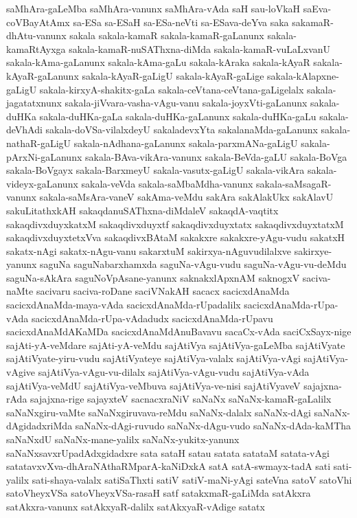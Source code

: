 {saMhAra-gaLeMba
saMhAra-vanunx
saMhAra-vAda
saH
sau-loVkaH
saEva-coVBayAtAmx
sa-ESa
sa-ESaH
sa-ESa-neVti
sa-ESava-deYva
saka
sakamaR-dhAtu-vanunx
sakala
sakala-kamaR
sakala-kamaR-gaLanunx
sakala-kamaRtAyxga
sakala-kamaR-nuSAThxna-diMda
sakala-kamaR-vuLaLxvanU
sakala-kAma-gaLanunx
sakala-kAma-gaLu
sakala-kAraka
sakala-kAyaR
sakala-kAyaR-gaLanunx
sakala-kAyaR-gaLigU
sakala-kAyaR-gaLige
sakala-kAlapxne-gaLigU
sakala-kirxyA-shakitx-gaLa
sakala-ceVtana-ceVtana-gaLigelalx
sakala-jagatatxnunx
sakala-jiVvara-vasha-vAgu-vanu
sakala-joyxVti-gaLanunx
sakala-duHKa
sakala-duHKa-gaLa
sakala-duHKa-gaLanunx
sakala-duHKa-gaLu
sakala-deVhAdi
sakala-doVSa-vilalxdeyU
sakaladevxYta
sakalanaMda-gaLanunx
sakala-nathaR-gaLigU
sakala-nAdhana-gaLanunx
sakala-parxmANa-gaLigU
sakala-pArxNi-gaLanunx
sakala-BAva-vikAra-vanunx
sakala-BeVda-gaLU
sakala-BoVga
sakala-BoVgayx
sakala-BarxmeyU
sakala-vasutx-gaLigU
sakala-vikAra
sakala-videyx-gaLanunx
sakala-veVda
sakala-saMbaMdha-vanunx
sakala-saMsagaR-vanunx
sakala-saMsAra-vaneV
sakAma-veMdu
sakAra
sakAlakUkx
sakAlavU
sakuLitathxkAH
sakaqdanuSAThxna-diMdaleV
sakaqdA-vaqtitx
sakaqdivxduyxkatxM
sakaqdivxduyxtf
sakaqdivxduyxtatx
sakaqdivxduyxtatxM
sakaqdivxduyxtetxVva
sakaqdivxBAtaM
sakakxre
sakakxre-yAgu-vudu
sakatxH
sakatx-nAgi
sakatx-nAgu-vanu
sakarxtuM
sakirxya-nAguvudilalxve
sakirxye-yanunx
saguNa
saguNabarxhamxda
saguNa-vAgu-vudu
saguNa-vAgu-vu-deMdu
saguNa-sAkAra
saguNoVpAsane-yanunx
saknakxlApxnAM
saknogxV
saciva-naMte
sacivaru
saciva-roDane
saciVNakAH
sacacx
sacicxdAnaMda
sacicxdAnaMda-maya-vAda
sacicxdAnaMda-rUpadalilx
sacicxdAnaMda-rUpa-vAda
sacicxdAnaMda-rUpa-vAdadudx
sacicxdAnaMda-rUpavu
sacicxdAnaMdAKaMDa
sacicxdAnaMdAnuBavavu
sacaCx-vAda
saciCxSayx-nige
sajAti-yA-veMdare
sajAti-yA-veMdu
sajAtiVya
sajAtiVya-gaLeMba
sajAtiVyate
sajAtiVyate-yiru-vudu
sajAtiVyateye
sajAtiVya-valalx
sajAtiVya-vAgi
sajAtiVya-vAgive
sajAtiVya-vAgu-vu-dilalx
sajAtiVya-vAgu-vudu
sajAtiVya-vAda
sajAtiVya-veMdU
sajAtiVya-veMbuva
sajAtiVya-ve-nisi
sajAtiVyaveV
sajajxna-rAda
sajajxna-rige
sajayxteV
sacnacxraNiV
saNaNx
saNaNx-kamaR-gaLalilx
saNaNxgiru-vaMte
saNaNxgiruvava-reMdu
saNaNx-dalalx
saNaNx-dAgi
saNaNx-dAgidadxriMda
saNaNx-dAgi-ruvudo
saNaNx-dAgu-vudo
saNaNx-dAda-kaMTha
saNaNxdU
saNaNx-mane-yalilx
saNaNx-yukitx-yanunx
saNaNxsavxrUpadAdxgidadxre
sata
sataH
satau
satata
satataM
satata-vAgi
satatavxvXva-dhAraNAthaRMparA-kaNiDxkA
satA
satA-swmayx-tadA
sati
sati-yalilx
sati-shaya-valalx
satiSaThxti
satiV
satiV-maNi-yAgi
sateVna
satoV
satoVhi
satoVheyxVSa
satoVheyxVSa-rasaH
satf
satakxmaR-gaLiMda
satAkxra
satAkxra-vanunx
satAkxyaR-dalilx
satAkxyaR-vAdige
satatx
}
